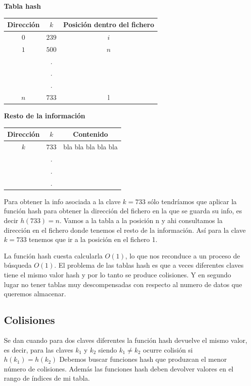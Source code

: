 \documentclass[10pt,a4paper,spanish]{report}
\begin{document}
\begin{minipage}{0.6\textwidth}
\begin{center}
\textbf{\textcolor[rgb]{0.3,0.4,0.8}{Tabla hash}}
\begin{tabular}{| c | c | c |}
\hline
Dirección & $k$ & Posición dentro del fichero \\
\hline
$0$ & $239$ & $i$ \\
$1$ & $500$ & $n$ \\
& . & \\
& . & \\
& . & \\
$n$ & $733$ & l \\
\hline
\end{tabular}
\end{center}
\end{minipage}
\begin{minipage}{0.6\textwidth}
\begin{center}
\textbf{\textcolor[rgb]{0.3,0.4,0.8}{Resto de la información}}
\begin{tabular}{| c | c | c |}
\hline
Dirección & $k$ & Contenido \\
\hline
$k$ & $733$ & bla bla bla bla bla \\
& . & \\
& . & \\
& . & \\
\hline
\end{tabular}
\end{center}
\end{minipage}

\noindent
Para obtener la info asociada a la clave $k = 733$ sólo tendríamos que aplicar la función hash para obtener la dirección del fichero
en la que se guarda su info, es decir $h(733) = n$. Vamos a la tabla a la posición n y ahi consultamos la dirección en el fichero donde tenemos
el resto de la información. Así para la clave $k = 733$ tenemos que ir a la posición en el fichero 1.

\noindent
La función  hash cuesta calcularla  $O(1)$, lo que nos reconduce a un proceso de búsqueda $O(1)$.
El problema de las tablas hash es que a veces diferentes claves tiene el mismo valor hash y por lo tanto se produce colisiones. Y en segundo lugar
no tener tablas muy descompensadas con respecto al numero de datos que queremos almacenar.

\subsection{\textcolor[rgb]{0.3,0.4,0.8}Colisiones}
\label{colisiones}
\noindent
Se dan cuando para dos claves diferentes la función hash devuelve el mismo valor, es decir, para las claves $k_1$ y $k_2$ siendo $k_1 \ne k_2$ ocurre colisión si $h(k_1) = h(k_2)$ Debemos buscar funciones hash que produzcan el menor número de colisiones.
Además las funciones hash deben devolver valores en el rango de índices de mi tabla.
\end{document}
